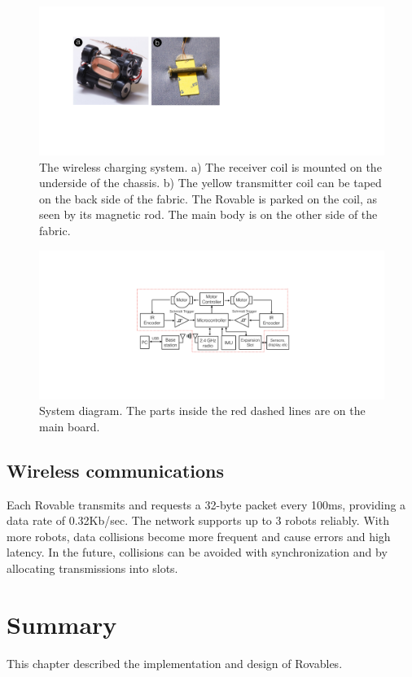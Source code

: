 \begin{figure}[!h]
\centering
\includegraphics[width=0.8\columnwidth]{pictures/chapter4/nfc_coil.pdf}
\caption{The wireless charging system. a) The receiver coil is mounted on the underside of the chassis. b) The yellow transmitter coil can be taped on the back side of the fabric. The Rovable is parked on the coil, as seen by its magnetic rod. The main body is on the other side of the fabric.}
\label{fig:nfc_coil}
\end{figure}

\begin{figure}[!h]
\centering
\includegraphics[width=0.8\columnwidth]{pictures/chapter4/system_diagram.pdf}
\caption{System diagram. The parts inside the red dashed lines are on the main board.}
\label{fig:system_diagram}
\end{figure}


\subsection{Wireless communications}
Each Rovable transmits and requests a 32-byte packet every 100ms, providing a data rate of 0.32Kb/sec. The network supports up to 3 robots reliably. With more robots, data collisions become more frequent and cause errors and high latency. In the future, collisions can be avoided with synchronization and by allocating transmissions into slots. 


\section{Summary}
This chapter described the implementation and design of Rovables. 
